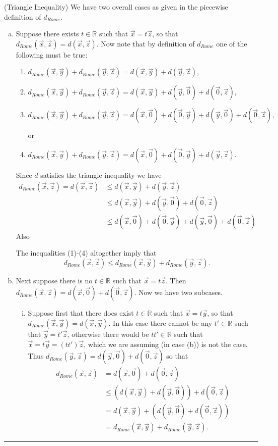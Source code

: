\documentclass[12pt]{article}
\newcommand{\R}{\mathbb R} %
\newcommand{\dr}{d_{Rome}}
\newcommand{\x}{\vec{x}}
\newcommand{\y}{\vec{y}}
\newcommand{\z}{\vec{z}}
\newcommand{\vz}{\vec{0}}
\newenvironment{proof}{\noindent {\bf Proof: }}{\hfill
\rule{1mm}{3mm} \bigskip}
\begin{document}
\begin{proof}
\noindent(Triangle Inequality) We have two overall cases as given in the piecewise definition of $\dr$.
\begin{enumerate}[(a)]
\item{Suppose there exists $t\in\R$ such that $\x = t\z$, so that $\dr(\x,\z)=d(\x,\z).$ Now note that by definition of $\dr$ one of the following must be true:
\begin{enumerate}[(1)]
\item{$\dr(\x,\y)+\dr(\y,\z) =d(\x,\y) +d(\y,\z),$ }
\item{$\dr(\x,\y)+\dr(\y,\z) =d(\x,\y) + d(\y,\vz) + d(\vz, \z)$, }
\item{$\dr(\x,\y)+\dr(\y,\z) =d(\x,\vz)+d(\vz,\y) + d(\y,\vz) + d(\vz, \z),$}

or

\item{$\dr(\x,\y)+\dr(\y,\z) =d(\x,\vz)+d(\vz,\y) + d(\y,\z).$}
\end{enumerate}
Since $d$ satisfies the triangle inequality we have
\begin{align} \dr(\x,\z)=d(\x,\z) &\leq d(\x,\y) + d(\y,\z) \\
						&\leq d(\x,\y) + d(\y,\vz) + d(\vz, \z)\\
						&\leq d(\x,\vz)+d(\vz,\y) + d(\y,\vz) + d(\vz, \z)
\end{align}
Also
The inequalities (1)-(4) altogether imply that $$\dr(\x,\z)\leq\dr(\x,\y)+\dr(\y,\z).$$}

\item{Next suppose there is no $t\in\R$ such that $\x=t\z$. Then $\dr(\x,\z) = d(\x,\vz)+d(\vz,\z)$. Now we have two subcases.
\begin{enumerate}[(i)] 

\item{Suppose first that there does exist $t\in\R$ such that $\x=t\y$, so that $\dr(\x,\y)=d(\x,\y).$ In this case there cannot be any $t'\in\R$ such that $\y=t'\z$, otherwise there would be $tt'\in\R$ such that $\x = t\y = (tt')\z$, which we are assuming (in case (b)) is not the case. Thus $\dr(\y,\z)=d(\y,\vz)+d(\vz,\z)$ so that
\begin{align*} \dr(\x,\z) &= d(\x,\vz) + d(\vz, \z)\\
				 &\leq (d(\x,\y)+d(\y,\vz)) + d(\vz,\z)\\
				&=d(\x,\y) + (d(\y,\vz)+d(\vz,\z))\\
				&=\dr(\x,\y)+\dr(\y,\z).
\end{align*}}


\end{enumerate}}
\end{enumerate}
\end{proof}
\end{document}
